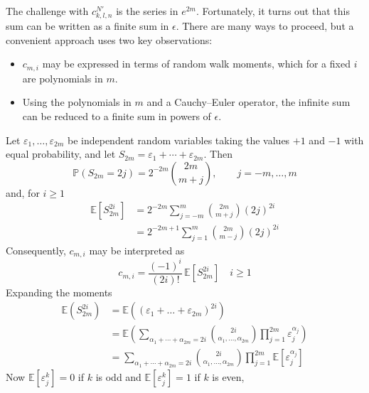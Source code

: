 \documentclass[a4paper]{amsart}
\begin{document}
The challenge with $c^{N'}_{k,l,n}$ is the series in $e^{2m}$. Fortunately, it turns out that this sum can be written as a finite sum in $\epsilon$. There are many ways to proceed, but a convenient approach uses two key observations:
\begin{itemize}
\item $c_{m,i}$ may be expressed in terms of random walk moments, which for a fixed $i$ are polynomials in $m$.
\item Using the polynomials in $m$ and a Cauchy--Euler operator, the infinite sum can be reduced to a finite sum in powers of $\epsilon$.
\end{itemize}
Let $\varepsilon_1,\ldots,\varepsilon_{2m}$ be independent random variables taking the values $+1$ and $-1$ with equal probability, and let $S_{2m}=\varepsilon_1+\cdots+\varepsilon_{2m}$. Then
\begin{equation*}
\mathbb P(S_{2m}=2j)=2^{-2m}\binom{2m}{m+j},\qquad j=-m,\dots,m
\end{equation*}
and, for $i\geq 1$
\begin{align*}
\mathbb{E}[S^{2i}_{2m}]&=2^{-2m}\sum_{j=-m}^{m}\binom{2m}{m+j}(2j)^{2i}\\
&=2^{-2m+1}\sum_{j=1}^{m}\binom{2m}{m-j}(2j)^{2i}
\end{align*}
Consequently, $c_{m,i}$ may be interpreted as
\begin{equation*}
c_{m,i}=\frac{(-1)^i}{(2i)!}\,\mathbb{E}[S_{2m}^{2i}]\quad i\geq 1
\end{equation*}
Expanding the moments
\begin{align*}
\mathbb{E}\left(S_{2m}^{2i}\right)&=\mathbb{E}\left(\left(\varepsilon_1+\dots+\varepsilon_{2m}\right)^{2i}\right)\\
&=\mathbb{E}\left(\sum_{\alpha_1+\cdots+\alpha_{2m}=2i}
\binom{2i}{\alpha_1,\ldots,\alpha_{2m}}
\prod_{j=1}^{2m}\varepsilon_j^{\alpha_j}\right)\\
&=\sum_{\alpha_1+\cdots+\alpha_{2m}=2i}
\binom{2i}{\alpha_1,\ldots,\alpha_{2m}}\prod_{j=1}^{2m}\mathbb E[\varepsilon_j^{\alpha_j}]
\end{align*}
Now $\mathbb{E}[\varepsilon_j^{k}] = 0$ if $k$ is odd and $\mathbb{E}[\varepsilon_j^{k}] = 1$ if $k$ is even,
\end{document}
